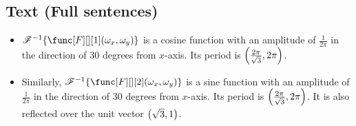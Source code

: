 \subsection{Text (Full sentences)}
\begin{itemize}
    \item $\invfourier{\func[F][][1](\omega_x,\omega_y)}$ is a cosine function with an amplitude of $\frac{1}{2\pi}$ in the direction of 30 degrees from $x$-axis. Its period is $\parens*{\frac{2\pi}{\sqrt{3}}, 2\pi}$.
    \item Similarly, $\invfourier{\func[F][][2](\omega_x,\omega_y)}$ is a sine function with an amplitude of $\frac{1}{2\pi}$ in the direction of 30 degrees from $x$-axis. Its period is $\parens*{\frac{2\pi}{\sqrt{3}}, 2\pi}$. It is also reflected over the unit vector $\parens*{\sqrt{3}, 1}$.
\end{itemize}

